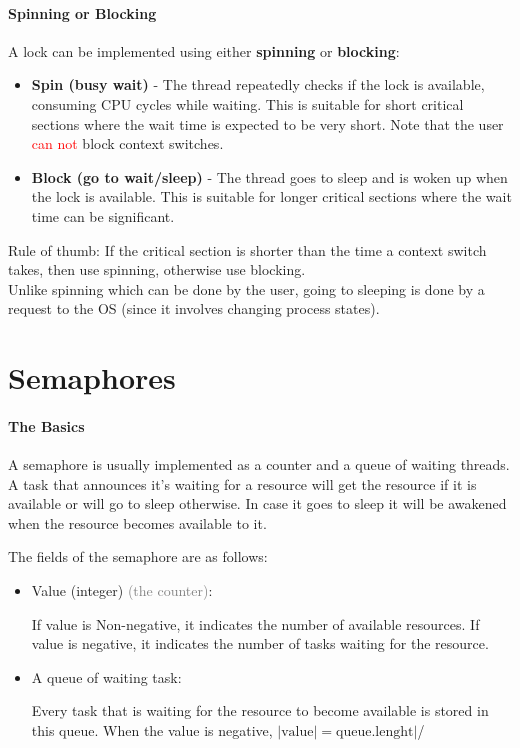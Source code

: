 \documentclass[openany,12pt]{book}
\newcommand{\red}[1]{\textcolor{Red}{#1}}
\newcommand{\gray}[1]{\textcolor{gray}{#1}}
\begin{document}
\paragraph{Spinning or Blocking} A lock can be implemented using either \textbf{spinning} or \textbf{blocking}:
\begin{itemize}
    \item \textbf{Spin (busy wait)} - The thread repeatedly checks if the lock is available, consuming CPU cycles while waiting. This is suitable for short critical sections where the wait time is expected to be very short. Note that the user \red{can not} block context switches.

    \item \textbf{Block (go to wait/sleep)} - The thread goes to sleep and is woken up when the lock is available. This is suitable for longer critical sections where the wait time can be significant.
\end{itemize}
Rule of thumb: If the critical section is shorter than the time a context switch takes, then use spinning, otherwise use blocking.\\
Unlike spinning which can be done by the user, going to sleeping is done by a request to the OS (since it involves changing process states).



\section*{Semaphores}

\paragraph{The Basics} A semaphore is usually implemented as a counter and a queue of waiting threads. A task that announces it's waiting for a resource will get the resource if it is available or will go to sleep otherwise. In case it goes to sleep it will be awakened when the resource becomes available to it.

The fields of the semaphore are as follows:
\begin{itemize}
    \item Value (integer) \gray{(the counter)}:\par
          If value is Non-negative, it indicates the number of available resources. If value is negative, it indicates the number of tasks waiting for the resource.

    \item A queue of waiting task: \par
          Every task that is waiting for the resource to become available is stored in this queue. When the value is negative, \(|\text{value}| = \text{queue.lenght}|\)/

\end{itemize}
\end{document}
